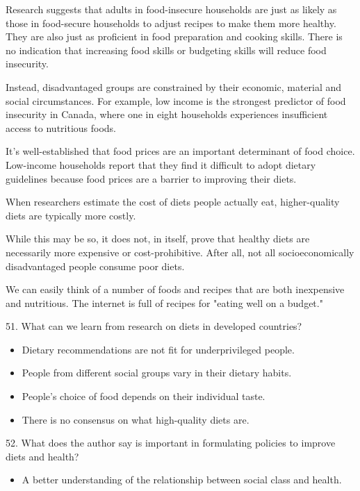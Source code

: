 \documentclass[UTF8,11pt]{ctexart}
\begin{document}
Research suggests that adults in food-insecure households are just as likely as those in food-secure households to adjust recipes to make them more healthy. They are also just as proficient in food preparation and cooking skills. There is no indication that increasing food skills or budgeting skills will reduce food insecurity.


Instead, disadvantaged groups are constrained by their economic, material and social circumstances. For example, low income is the strongest predictor of food insecurity in Canada, where one in eight households experiences insufficient access to nutritious foods.


It's well-established that food prices are an important determinant of food choice. Low-income households report that they find it difficult to adopt dietary guidelines because food prices are a barrier to improving their diets.


When researchers estimate the cost of diets people actually eat, higher-quality diets are typically more costly.


While this may be so, it does not, in itself, prove that healthy diets are necessarily more expensive or cost-prohibitive. After all, not all socioeconomically disadvantaged people consume poor diets.


We can easily think of a number of foods and recipes that are both inexpensive and nutritious. The internet is full of recipes for "eating well on a budget."


51. What can we learn from research on diets in developed countries?


\begin{itemize}[leftmargin=2em,itemsep=.2em,topsep=.4em]\item[A.] Dietary recommendations are not fit for underprivileged people.
\item[B.] People from different social groups vary in \textperiodcentered{}their dietary habits.
\item[C.] People's choice of food depends on their individual taste.
\item[D.] There is no consensus on what high-quality diets are.
\end{itemize}

52. What does the author say is important in formulating policies to improve diets and health?


\begin{itemize}[leftmargin=2em,itemsep=.2em,topsep=.4em]\item[A.] A better understanding of the relationship between social class and health.
\end{itemize}
\end{document}

